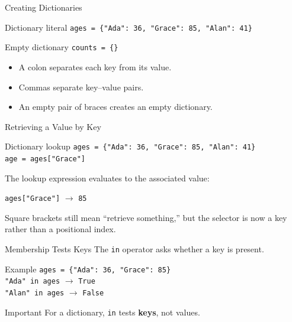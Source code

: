 \documentclass[aspectratio=169,10pt]{beamer}
\begin{document}

\begin{frame}{Creating Dictionaries}
  \begin{block}{Dictionary literal}
    \texttt{ages = \{"Ada": 36, "Grace": 85, "Alan": 41\}}
  \end{block}

  \begin{block}{Empty dictionary}
    \texttt{counts = \{\}}
  \end{block}

  \begin{itemize}
    \item A colon separates each key from its value.
    \item Commas separate key--value pairs.
    \item An empty pair of braces creates an empty dictionary.
  \end{itemize}
\end{frame}

\begin{frame}{Retrieving a Value by Key}
  \begin{block}{Dictionary lookup}
    \texttt{ages = \{"Ada": 36, "Grace": 85, "Alan": 41\}}\\[0.08in]
    \texttt{age = ages["Grace"]}
  \end{block}

  The lookup expression evaluates to the associated value:

  \begin{center}
    \texttt{ages["Grace"]} $\longrightarrow$ \texttt{85}
  \end{center}

  \begin{keyidea}
    Square brackets still mean ``retrieve something,'' but the selector is now a key rather than a positional index.
  \end{keyidea}
\end{frame}

\begin{frame}{Membership Tests Keys}
  The \texttt{in} operator asks whether a key is present.

  \begin{block}{Example}
    \texttt{ages = \{"Ada": 36, "Grace": 85\}}\\[0.08in]
    \texttt{"Ada" in ages} $\longrightarrow$ \texttt{True}\\
    \texttt{"Alan" in ages} $\longrightarrow$ \texttt{False}
  \end{block}

  \begin{alertblock}{Important}
    For a dictionary, \texttt{in} tests \textbf{keys}, not values.
  \end{alertblock}
\end{frame}
\end{document}
